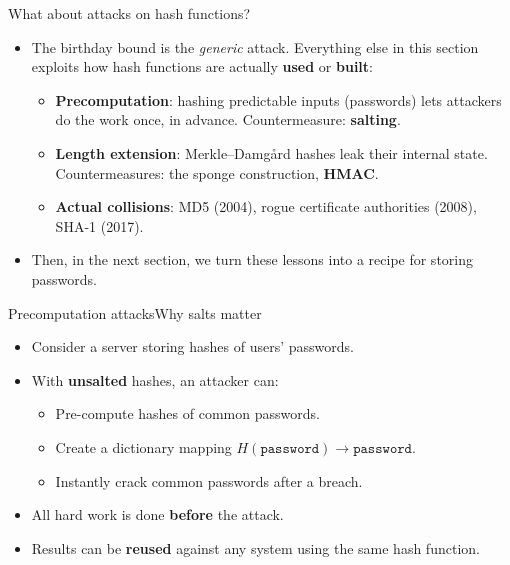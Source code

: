 \ifdefined\PRESENTATION\else\PassOptionsToClass{handout}{beamer}\fi\documentclass[aspectratio=169, lualatex]{beamer}
\begin{document}
\begin{frame}{What about attacks on hash functions?}
	\begin{itemize}
		\item The birthday bound is the \emph{generic} attack. Everything else in this section exploits how hash functions are actually \textbf{used} or \textbf{built}:
		      \begin{itemize}
			      \item \textbf{Precomputation}: hashing predictable inputs (passwords) lets attackers do the work once, in advance. Countermeasure: \textbf{salting}.
			      \item \textbf{Length extension}: Merkle--Damg\aa rd hashes leak their internal state. Countermeasures: the sponge construction, \textbf{HMAC}.
			      \item \textbf{Actual collisions}: MD5 (2004), rogue certificate authorities (2008), SHA-1 (2017).
		      \end{itemize}
		\item Then, in the next section, we turn these lessons into a recipe for storing passwords.
	\end{itemize}
\end{frame}

\begin{frame}{Precomputation attacks}{Why salts matter}
	\begin{itemize}
		\item Consider a server storing hashes of users' passwords.
		\item With \textbf{unsalted} hashes, an attacker can:
		      \begin{itemize}
			      \item Pre-compute hashes of common passwords.
			      \item Create a dictionary mapping $H(\texttt{password}) \rightarrow \texttt{password}$.
			      \item Instantly crack common passwords after a breach.
		      \end{itemize}
		\item All hard work is done \textbf{before} the attack.
		\item Results can be \textbf{reused} against any system using the same hash function.
	\end{itemize}
\end{frame}
\end{document}
